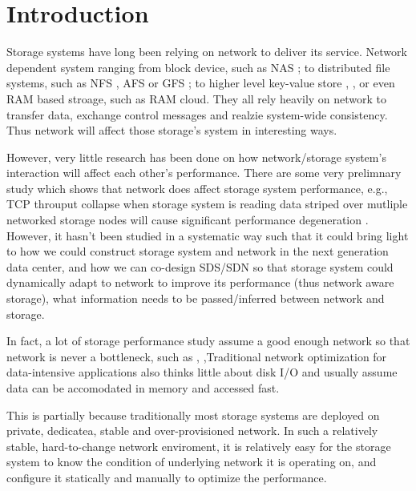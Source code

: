 \section{Introduction}
\label{section:intro}

Storage systems have long been relying on network to deliver its service. Network dependent system ranging from block device, such as NAS \cite{nas}; to distributed file systems, such as NFS \cite{nfs}, AFS \cite{afs} or GFS \cite{gfs}; to higher level key-value store \cite{dynamo}, \cite{big-table}, or even RAM based stroage, such as RAM cloud. They all rely heavily on network to transfer data, exchange control messages and realzie system-wide consistency. Thus network will affect those storage's system in interesting ways.

However, very little research has been done on how network/storage system's interaction will affect each other's performance. There are some very prelimnary study which shows that network does affect storage system performance, e.g., TCP throuput collapse when storage system is reading data striped over mutliple networked storage nodes will cause significant performance degeneration \cite{incast}.
 However, it hasn't been studied in a systematic way such that it could bring light to how we could construct storage system and network in the next generation data center, and how we can co-design SDS/SDN so that storage system could dynamically adapt to network to improve its performance (thus network aware storage), what information needs to be passed/inferred between network and storage. 


In fact, a lot of storage performance study assume a good enough network so that network is never a bottleneck, such as \cite{shedule-storage-system}, \cite{cloud-fair-storage},Traditional network optimization for data-intensive applications also thinks little about disk I/O and usually assume data can be accomodated in memory and accessed fast.

This is partially because traditionally most storage systems are deployed on private, dedicatea, stable and over-provisioned network.
 In such a relatively stable, hard-to-change network enviroment, it is relatively easy for the storage system to know the condition of underlying network it is operating on, and configure it statically and manually to optimize the performance.

